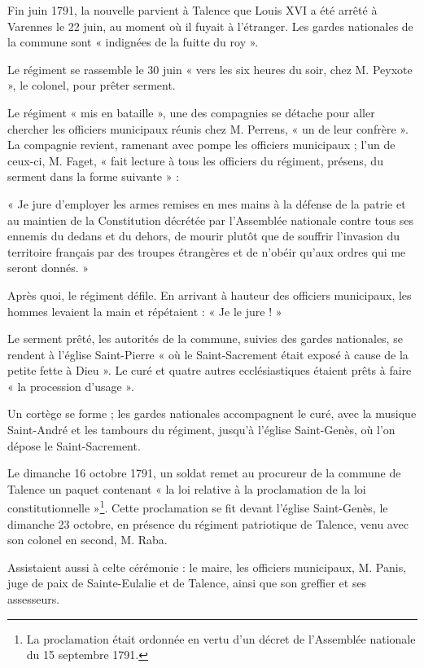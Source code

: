 \documentclass[a4paper,11pt]{book}
\begin{document}
Fin juin 1791, la nouvelle parvient à Talence que Louis XVI a été arrêté à Varennes le 22 juin, au moment où il fuyait à l'étranger. Les gardes nationales de la commune sont « indignées de la fuitte du roy ».

Le régiment se rassemble le 30 juin « vers les six heures du soir, chez M. Peyxote », le colonel, pour prêter serment.

Le régiment « mis en bataille », une des compagnies se détache pour aller chercher les officiers municipaux réunis chez M. Perrens, « un de leur confrère ». La compagnie revient, ramenant avec pompe les officiers municipaux ; l'un de ceux-ci, M. Faget, « fait lecture à tous les officiers du régiment, présens, du serment dans la forme suivante » :

« Je jure d'employer les armes remises en mes mains à la défense de la patrie et au maintien de la Constitution décrétée par l'Assemblée nationale contre tous ses ennemis du dedans et du dehors, de mourir plutôt que de souffrir l'invasion du territoire français par des troupes étrangères et de n'obéir qu'aux ordres qui me seront donnés. »

Après quoi, le régiment défile. En arrivant à hauteur des officiers municipaux, les hommes levaient la main et répétaient : « Je le jure ! »

Le serment prêté, les autorités de la commune, suivies des gardes nationales, se rendent à l'église Saint-Pierre « où le Saint-Sacrement était exposé à cause de la petite fette à Dieu ». Le curé et quatre autres ecclésiastiques étaient prêts à faire « la procession d'usage ».

Un cortège se forme ; les gardes nationales accompagnent le curé, avec la musique Saint-André et les tambours du régiment, jusqu'à l'église Saint-Genès, où l'on dépose
le Saint-Sacrement.

Le dimanche 16 octobre 1791, un soldat remet au procureur de la commune de Talence un paquet contenant « la loi relative à la proclamation de la loi constitutionnelle »\footnote{La proclamation était ordonnée en vertu d'un décret de l'Assemblée nationale du 15 septembre 1791.}. Cette proclamation se fit devant l'église Saint-Genès, le dimanche 23 octobre, en présence du régiment patriotique de Talence, venu avec son colonel en second, M. Raba.

Assistaient aussi à celte cérémonie : le maire, les officiers municipaux, M. Panis, juge de paix de Sainte-Eulalie et de Talence, ainsi que son greffier et ses assesseurs.
\end{document}
